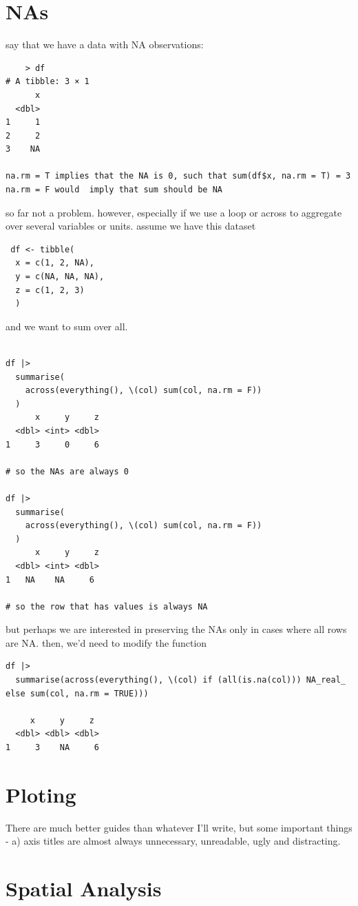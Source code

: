 \section{NAs}
say that we have a data with NA observations:
\begin{verbatim}
    > df
# A tibble: 3 × 1
      x
  <dbl>
1     1
2     2
3    NA

na.rm = T implies that the NA is 0, such that sum(df$x, na.rm = T) = 3
na.rm = F would  imply that sum should be NA

\end{verbatim}
so far not a problem.
however, especially if we use a loop or across to aggregate over several variables or units. assume we have this dataset
\begin{verbatim}
 df <- tibble(
  x = c(1, 2, NA),
  y = c(NA, NA, NA),
  z = c(1, 2, 3)
  )
\end{verbatim}
and we want to sum over all. 
\begin{verbatim}

df |> 
  summarise(
    across(everything(), \(col) sum(col, na.rm = F))
  )
      x     y     z
  <dbl> <int> <dbl>
1     3     0     6

# so the NAs are always 0

df |> 
  summarise(
    across(everything(), \(col) sum(col, na.rm = F))
  )
      x     y     z
  <dbl> <int> <dbl>
1   NA    NA     6

# so the row that has values is always NA

\end{verbatim}

but perhaps we are interested in preserving the NAs only in cases where all rows are NA. then, we'd need to modify the function

\begin{verbatim}
df |> 
  summarise(across(everything(), \(col) if (all(is.na(col))) NA_real_ else sum(col, na.rm = TRUE)))

     x     y     z
  <dbl> <dbl> <dbl>
1     3    NA     6
\end{verbatim}

\section{Ploting}
There are much better guides than whatever I'll write, but some important things - 
a) axis titles are almost always unnecessary, unreadable, ugly and distracting. 

\section{Spatial Analysis}

